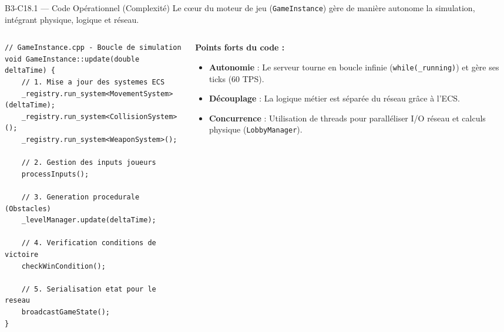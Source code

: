 \documentclass[aspectratio=169,10pt]{beamer}
\begin{document}
\begin{frame}[fragile]{B3-C18.1 — Code Opérationnel (Complexité)}
  \scriptsize
  Le cœur du moteur de jeu (\texttt{GameInstance}) gère de manière autonome la simulation, intégrant physique, logique et réseau.
  
  \begin{columns}[T]
  \begin{column}{0.55\textwidth}
  \begin{lstlisting}[basicstyle=\ttfamily\tiny]
// GameInstance.cpp - Boucle de simulation
void GameInstance::update(double deltaTime) {
    // 1. Mise a jour des systemes ECS
    _registry.run_system<MovementSystem>(deltaTime);
    _registry.run_system<CollisionSystem>();
    _registry.run_system<WeaponSystem>();
    
    // 2. Gestion des inputs joueurs
    processInputs();
    
    // 3. Generation procedurale (Obstacles)
    _levelManager.update(deltaTime);
    
    // 4. Verification conditions de victoire
    checkWinCondition();
    
    // 5. Serialisation etat pour le reseau
    broadcastGameState();
}
  \end{lstlisting}
  \end{column}
  
  \begin{column}{0.4\textwidth}
  \textbf{Points forts du code :}
  \begin{itemize}
    \item \textbf{Autonomie} : Le serveur tourne en boucle infinie (\texttt{while(_running)}) et gère ses ticks (60 TPS).
    \item \textbf{Découplage} : La logique métier est séparée du réseau grâce à l'ECS.
    \item \textbf{Concurrence} : Utilisation de threads pour paralléliser I/O réseau et calculs physique (\texttt{LobbyManager}).
  \end{itemize}
  \end{column}
  \end{columns}
\end{frame}
\end{document}

